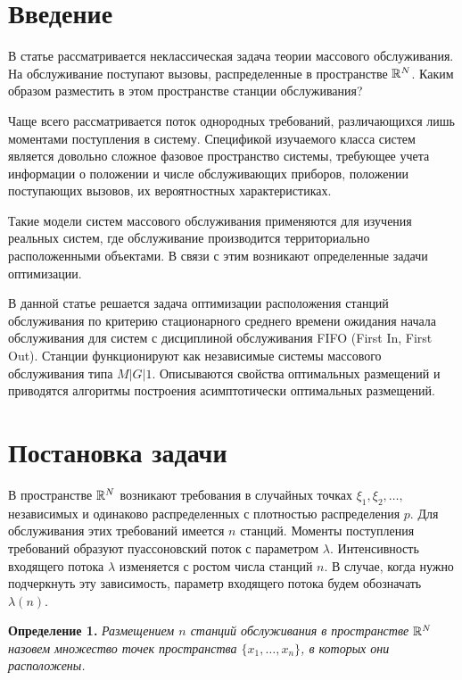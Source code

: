       \begin{multicols}{2}

      \label{st\stat}

\section{Введение}



В статье рассматривается неклассическая задача теории массового обслуживания. На обслуживание
поступают вызовы, распределенные в пространстве ${\mathbb{R}}^N$. Каким образом разместить в этом
пространстве станции обслуживания?

Чаще всего рассматривается поток однородных требований, различающихся лишь моментами
поступления в систему. Спецификой изучаемого класса систем является довольно сложное фазовое
пространство системы, требующее учета информации о положении и числе обслуживающих приборов,
положении поступающих вызовов, их вероятностных характеристиках.

Такие модели систем массового обслуживания применяются для изучения
реальных систем, где обслуживание производится территориально расположенными объектами.
В связи с этим возникают определенные задачи оптимизации.

В данной статье решается задача оптимизации расположения станций обслуживания по критерию
стационарного среднего времени ожидания начала обслуживания для систем с дисциплиной
обслуживания FIFO (First In, First Out). Станции функционируют как независимые системы массового обслуживания типа
$M\vert G\vert 1$. Описываются свойства оптимальных размещений и приводятся алгоритмы построения
асимптотически оптимальных размещений.

\section{Постановка задачи}

В пространстве ${\mathbb{R}}^N$ возникают требования в случайных точках $\xi_1,\xi_2,\dots,$ независимых и
одинаково распределенных с плотностью распределения $p$. Для обслуживания этих требований
имеется $n$ станций. Моменты поступления требований образуют пуассоновский поток с параметром
$\lambda$. Интенсивность входящего потока $\lambda$ изменяется с ростом чис\-ла станций $n$. В
случае, когда нужно подчеркнуть эту зависимость, параметр входящего потока будем обозначать
$\lambda(n)$.

\noindent
\textbf{Определение 1.} \textit{Размещением $n$ станций обслуживания в пространстве ${\mathbb{R}}^N$ назовем
множество точек пространства $\{x_1,\ldots,x_n\}$, в которых они расположены.}


\end{multicols}
